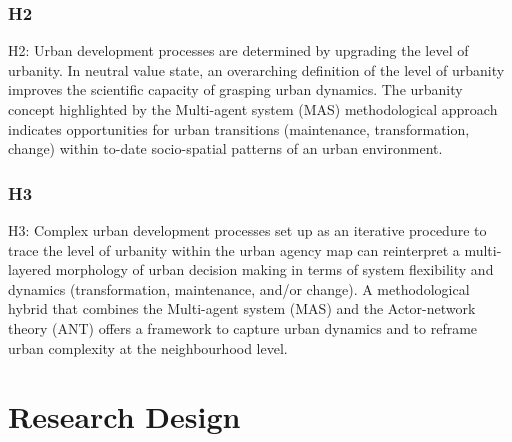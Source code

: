 \documentclass[11pt]{report}
\begin{document}
\subsubsection{H2}

H2:  Urban development processes are determined  by  upgrading the  level  of  urbanity.  In neutral value state, an overarching definition of the level of urbanity improves the scientific capacity of grasping urban dynamics. The urbanity concept highlighted by the Multi-agent system (MAS) methodological approach indicates opportunities for urban transitions (maintenance, transformation, change) within to-date socio-spatial patterns of an urban environment. 

\subsubsection{H3}

H3: Complex urban development processes set up as an iterative procedure to trace the level of urbanity within the urban agency map can reinterpret a multi-layered morphology of urban decision making in terms of system flexibility and dynamics (transformation, maintenance, and/or change). A methodological hybrid that combines the Multi-agent system (MAS) and the Actor-network theory (ANT) offers a framework to capture urban dynamics and to reframe urban complexity at the neighbourhood level.

\section{Research Design}
\end{document}
